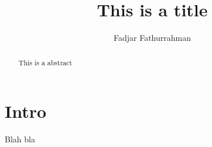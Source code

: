 \documentclass[a4paper]{jpconf}
\begin{document}
\title{This is a title}
\author{Fadjar Fathurrahman}
\address{Some where on Earth}

\begin{abstract}
This is a abstract
\end{abstract}

\section{Intro}
Blah bla
\end{document}

